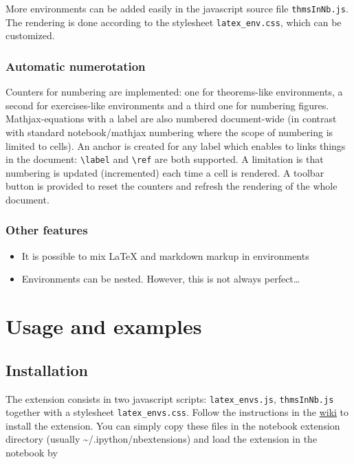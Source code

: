 More environments can be added easily in the javascript source file
\texttt{thmsInNb.js}. The rendering is done according to the stylesheet
\texttt{latex\_env.css}, which can be customized.

    \subsubsection{Automatic numerotation}\label{automatic-numerotation}

    Counters for numbering are implemented: one for theorems-like
environments, a second for exercises-like environments and a third one
for numbering figures.\\Mathjax-equations with a label are also numbered
document-wide (in contrast with standard notebook/mathjax numbering
where the scope of numbering is limited to cells). An anchor is created
for any label which enables to links things in the document:
\texttt{\textbackslash{}label} and \texttt{\textbackslash{}ref} are both
supported. A limitation is that numbering is updated (incremented) each
time a cell is rendered. A toolbar button is provided to reset the
counters and refresh the rendering of the whole document.

    \subsubsection{Other features}\label{other-features}

    \begin{itemize}
\itemsep1pt\parskip0pt
\item
  It is possible to mix LaTeX and markdown markup in environments\\
\item
  Environments can be nested. However, this is not always
  perfect\ldots{}
\end{itemize}

    \section{Usage and examples}\label{usage-and-examples}

    \subsection{Installation}\label{installation}

    The extension consists in two javascript scripts:
\texttt{latex\_envs.js}, \texttt{thmsInNb.js} together with a stylesheet
\texttt{latex\_envs.css}. Follow the instructions in the
\href{https://github.com/ipython-contrib/IPython-notebook-extensions/wiki}{wiki}
to install the extension. You can simply copy these files in the
notebook extension directory (usually
\textasciitilde{}/.ipython/nbextensions) and load the extension in the
notebook by

